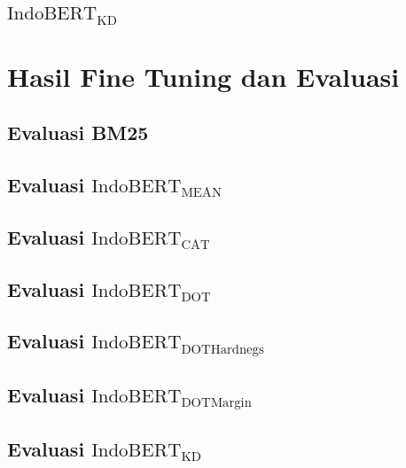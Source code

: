 \subsection{$\text{IndoBERT}_{\text{KD}}$}


\section{Hasil Fine Tuning dan Evaluasi}
\label{sec:hasil}

\subsection{Evaluasi BM25}

\subsection{Evaluasi $\text{IndoBERT}_{\text{MEAN}}$}

\subsection{Evaluasi $\text{IndoBERT}_{\text{CAT}}$}

\subsection{Evaluasi $\text{IndoBERT}_{\text{DOT}}$}

\subsection{Evaluasi $\text{IndoBERT}_{\text{DOTHardnegs}}$}

\subsection{Evaluasi $\text{IndoBERT}_{\text{DOTMargin}}$}

\subsection{Evaluasi $\text{IndoBERT}_{\text{KD}}$}
